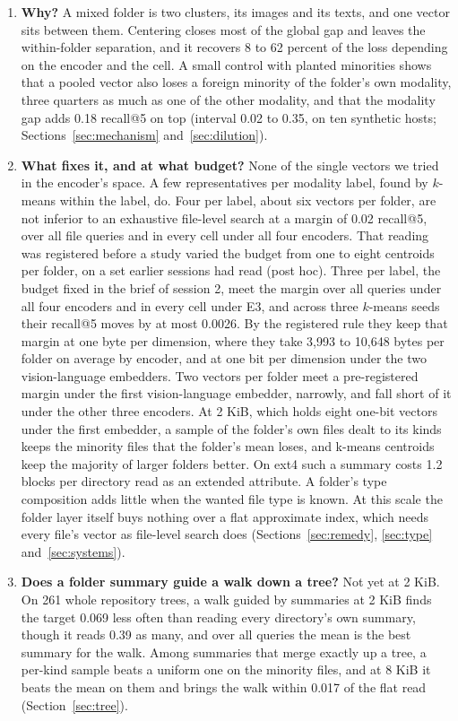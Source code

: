 \documentclass[11pt]{article}
\begin{document}
\begin{enumerate}
\item \textbf{Why?} A mixed folder is two clusters, its images and its texts, and one vector sits between them. Centering closes most of the global gap and leaves the within-folder separation, and it recovers 8 to 62 percent of the loss depending on the encoder and the cell. A small control with planted minorities shows that a pooled vector also loses a foreign minority of the folder's own modality, three quarters as much as one of the other modality, and that the modality gap adds 0.18 recall@5 on top (interval 0.02 to 0.35, on ten synthetic hosts; Sections~\ref{sec:mechanism} and~\ref{sec:dilution}).
\item \textbf{What fixes it, and at what budget?} None of the single vectors we tried in the encoder's space. A few representatives per modality label, found by $k$-means within the label, do. Four per label, about six vectors per folder, are not inferior to an exhaustive file-level search at a margin of 0.02 recall@5, over all file queries and in every cell under all four encoders. That reading was registered before a study varied the budget from one to eight centroids per folder, on a set earlier sessions had read (post hoc). Three per label, the budget fixed in the brief of session 2, meet the margin over all queries under all four encoders and in every cell under E3, and across three $k$-means seeds their recall@5 moves by at most 0.0026. By the registered rule they keep that margin at one byte per dimension, where they take 3,993 to 10,648 bytes per folder on average by encoder, and at one bit per dimension under the two vision-language embedders. Two vectors per folder meet a pre-registered margin under the first vision-language embedder, narrowly, and fall short of it under the other three encoders. At 2 KiB, which holds eight one-bit vectors under the first embedder, a sample of the folder's own files dealt to its kinds keeps the minority files that the folder's mean loses, and k-means centroids keep the majority of larger folders better. On ext4 such a summary costs 1.2 blocks per directory read as an extended attribute. A folder's type composition adds little when the wanted file type is known. At this scale the folder layer itself buys nothing over a flat approximate index, which needs every file's vector as file-level search does (Sections~\ref{sec:remedy}, \ref{sec:type} and~\ref{sec:systems}).
\item \textbf{Does a folder summary guide a walk down a tree?} Not yet at 2 KiB. On 261 whole repository trees, a walk guided by summaries at 2 KiB finds the target 0.069 less often than reading every directory's own summary, though it reads 0.39 as many, and over all queries the mean is the best summary for the walk. Among summaries that merge exactly up a tree, a per-kind sample beats a uniform one on the minority files, and at 8 KiB it beats the mean on them and brings the walk within 0.017 of the flat read (Section~\ref{sec:tree}).

\end{enumerate}
\end{document}
